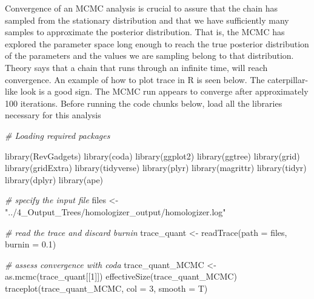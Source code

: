 \documentclass[
]{book}
\newenvironment{Shaded}{\begin{snugshade}}{\end{snugshade}}
\newcommand{\AttributeTok}[1]{\textcolor[rgb]{0.77,0.63,0.00}{#1}}
\newcommand{\CommentTok}[1]{\textcolor[rgb]{0.56,0.35,0.01}{\textit{#1}}}
\newcommand{\DecValTok}[1]{\textcolor[rgb]{0.00,0.00,0.81}{#1}}
\newcommand{\FloatTok}[1]{\textcolor[rgb]{0.00,0.00,0.81}{#1}}
\newcommand{\FunctionTok}[1]{\textcolor[rgb]{0.00,0.00,0.00}{#1}}
\newcommand{\NormalTok}[1]{#1}
\newcommand{\OtherTok}[1]{\textcolor[rgb]{0.56,0.35,0.01}{#1}}
\newcommand{\StringTok}[1]{\textcolor[rgb]{0.31,0.60,0.02}{#1}}
\begin{document}
Convergence of an MCMC analysis is crucial to assure that the chain has sampled from the stationary distribution and that we have sufficiently many samples to approximate the posterior distribution. That is, the MCMC has explored the parameter space long enough to reach the true posterior distribution of the parameters and the values we are sampling belong to that distribution. Theory says that a chain that runs through an infinite time, will reach convergence. An example of how to plot trace in R is seen below. The caterpillar-like look is a good sign. The MCMC run appears to converge after approximately 100 iterations.
Before running the code chunks below, load all the libraries necessary for this analysis

\begin{Shaded}
\begin{Highlighting}[]
\CommentTok{\# Loading required packages}

\FunctionTok{library}\NormalTok{(RevGadgets)}
\FunctionTok{library}\NormalTok{(coda)}
\FunctionTok{library}\NormalTok{(ggplot2)}
\FunctionTok{library}\NormalTok{(ggtree)}
\FunctionTok{library}\NormalTok{(grid)}
\FunctionTok{library}\NormalTok{(gridExtra)}
\FunctionTok{library}\NormalTok{(tidyverse)}
\FunctionTok{library}\NormalTok{(plyr)}
\FunctionTok{library}\NormalTok{(magrittr)}
\FunctionTok{library}\NormalTok{(tidyr)}
\FunctionTok{library}\NormalTok{(dplyr)}
\FunctionTok{library}\NormalTok{(ape)}
\end{Highlighting}
\end{Shaded}

\begin{Shaded}
\begin{Highlighting}[]
\CommentTok{\# specify the input file}
\NormalTok{files }\OtherTok{\textless{}{-}} \StringTok{"../4\_Output\_Trees/homologizer\_output/homologizer.log"}

\CommentTok{\# read the trace and discard burnin}
\NormalTok{trace\_quant }\OtherTok{\textless{}{-}} \FunctionTok{readTrace}\NormalTok{(}\AttributeTok{path =}\NormalTok{ files, }\AttributeTok{burnin =} \FloatTok{0.1}\NormalTok{)}

\CommentTok{\# assess convergence with coda }
\NormalTok{trace\_quant\_MCMC }\OtherTok{\textless{}{-}} \FunctionTok{as.mcmc}\NormalTok{(trace\_quant[[}\DecValTok{1}\NormalTok{]])}
\FunctionTok{effectiveSize}\NormalTok{(trace\_quant\_MCMC)}
\FunctionTok{traceplot}\NormalTok{(trace\_quant\_MCMC, }\AttributeTok{col =} \DecValTok{3}\NormalTok{, }\AttributeTok{smooth =}\NormalTok{ T)}
\end{Highlighting}
\end{Shaded}
\end{document}
